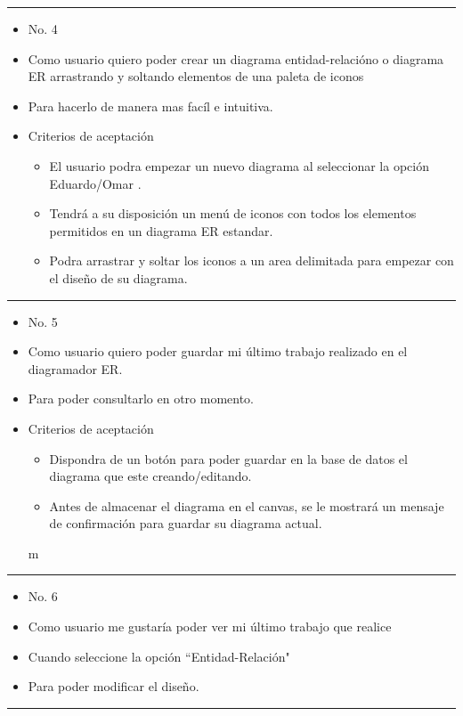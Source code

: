 \noindent\rule{\textwidth}{1pt}
\begin{itemize}
	\item No. 4
	\item Como usuario quiero poder crear un diagrama entidad-relacióno o diagrama ER arrastrando y soltando elementos de una paleta de iconos
	\item Para hacerlo de manera mas facíl e intuitiva.
	\item Criterios de aceptación
	\begin{itemize}
		\item El usuario podra empezar un nuevo diagrama al seleccionar la opción  Eduardo/Omar .
		\item Tendrá a su disposición un menú de iconos con todos los elementos permitidos en un diagrama ER estandar.
		\item Podra arrastrar y soltar los iconos a un area delimitada para empezar con el diseño de su diagrama.
	\end{itemize}
\end{itemize}
\noindent\rule{\textwidth}{1pt}
\begin{itemize}
	\item No. 5
	\item Como usuario quiero poder guardar mi último trabajo realizado en el diagramador ER.
	\item Para poder consultarlo en otro momento.
	\item Criterios de aceptación
	\begin{itemize}
		\item Dispondra de un botón para poder guardar en la base de datos el diagrama que este creando/editando.
		\item Antes de almacenar el diagrama en el canvas, se le mostrará un mensaje de confirmación para guardar su diagrama actual.
	\end{itemize}m
\end{itemize}
\noindent\rule{\textwidth}{1pt}
\begin{itemize}
	\item No. 6
	\item Como usuario me gustaría poder ver mi último trabajo que realice
	\item Cuando seleccione la opción ``Entidad-Relación"
	\item Para poder modificar el diseño.
\end{itemize}
\noindent\rule{\textwidth}{1pt}

